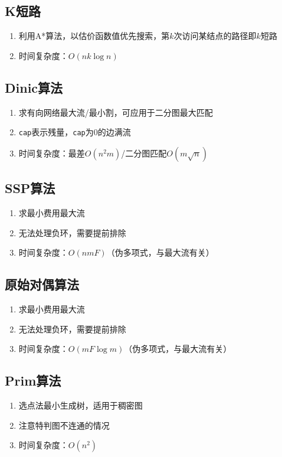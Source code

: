 \documentclass[twocolumn,a4,8pt]{article}  %
\begin{document}
		\subsection{K短路}
			\noindent\begin{enumerate}
				\item 利用A*算法，以估价函数值优先搜索，第$k$次访问某结点的路径即$k$短路
				\item 时间复杂度：$O(nk\log n)$
			\end{enumerate}
	 	 	
	 	 	
		\subsection{Dinic算法}
			\noindent\begin{enumerate}
				\item 求有向网络最大流/最小割，可应用于二分图最大匹配
				\item \texttt{cap}表示残量，\texttt{cap}为$0$的边满流
				\item 时间复杂度：最差$O(n^2m)$/二分图匹配$O(m\sqrt{n})$
			\end{enumerate}
	 	 	
	 	 	
		\subsection{SSP算法}
			\noindent\begin{enumerate}
				\item 求最小费用最大流
				\item 无法处理负环，需要提前排除
				\item 时间复杂度：$O(nmF)$（伪多项式，与最大流有关）
			\end{enumerate}
	 	 	
	 	 	
		\subsection{原始对偶算法}
			\noindent\begin{enumerate}
				\item 求最小费用最大流
				\item 无法处理负环，需要提前排除
				\item 时间复杂度：$O(mF\log m)$（伪多项式，与最大流有关）
			\end{enumerate}
	 	 	
	 	 	
		\subsection{Prim算法}
			\noindent\begin{enumerate}
				\item 选点法最小生成树，适用于稠密图
				\item 注意特判图不连通的情况
				\item 时间复杂度：$O(n^2)$
			\end{enumerate}
	 	 	
	 	 	
\end{document}
